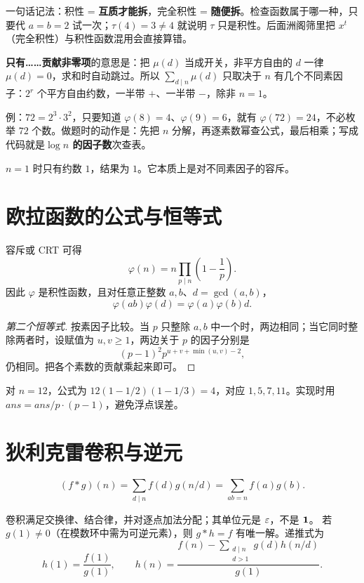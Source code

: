 \begin{tip}[词义：积性 / 完全积性]
一句话记法：积性 = \textbf{互质才能拆}，完全积性 = \textbf{随便拆}。检查函数属于哪一种，只要代 $a=b=2$ 试一次；$\tau(4)=3\ne4$ 就说明 $\tau$ 只是积性。后面洲阁筛里把 $x^t$（完全积性）与积性函数混用会直接算错。
\end{tip}

\begin{tip}[词义：把 $\mu(d)$ 当开关]
\textbf{只有……贡献非零项}的意思是：把 $\mu(d)$ 当成开关，非平方自由的 $d$ 一律 $\mu(d)=0$，求和时自动跳过。所以 $\sum_{d\mid n}\mu(d)$ 只取决于 $n$ 有几个不同素因子：$2^r$ 个平方自由约数，一半带 $+$、一半带 $-$，除非 $n=1$。
\end{tip}

\begin{tip}
例：$72=2^3\cdot3^2$，只要知道 $\varphi(8)=4$、$\varphi(9)=6$，就有 $\varphi(72)=24$，不必枚举 $72$ 个数。做题时的动作是：先把 $n$ 分解，再逐素数幂查公式，最后相乘；写成代码就是\textbf{$\log n$ 的因子数}次查表。
\end{tip}

$n=1$ 时只有约数 $1$，结果为 $1$。它本质上是对不同素因子的容斥。


\section{欧拉函数的公式与恒等式}
容斥或 CRT 可得
\[
 \varphi(n)=n\prod_{p\mid n}\left(1-\frac1p\right).
\]
因此 $\varphi$ 是积性函数，且对任意正整数 $a,b$、$d=\gcd(a,b)$，
\[
 \varphi(ab)\varphi(d)=\varphi(a)\varphi(b)d.
\]

\begin{proof}[第二个恒等式]
按素因子比较。当 $p$ 只整除 $a,b$ 中一个时，两边相同；当它同时整除两者时，设赋值为 $u,v\ge1$，两边关于 $p$ 的因子分别是
\[
 (p-1)^2p^{u+v+\min(u,v)-2},
\]
仍相同。把各个素数的贡献乘起来即可。
\end{proof}
对 $n=12$，公式为 $12(1-1/2)(1-1/3)=4$，对应 $1,5,7,11$。实现时用 $ans=ans/p\cdot(p-1)$，避免浮点误差。


\section{狄利克雷卷积与逆元}
\begin{definition}
\[
 (f*g)(n)=\sum_{d\mid n}f(d)g(n/d)=\sum_{ab=n}f(a)g(b).
\]
\end{definition}
卷积满足交换律、结合律，并对逐点加法分配；其单位元是 $\varepsilon$，不是 $\mathbf 1$。
若 $g(1)\ne0$（在模数环中需为可逆元素），则 $g*h=f$ 有唯一解。递推式为
\[
 h(1)=\frac{f(1)}{g(1)},\qquad
 h(n)=\frac{f(n)-\sum_{\substack{d\mid n\\d>1}}g(d)h(n/d)}{g(1)}.
\]

